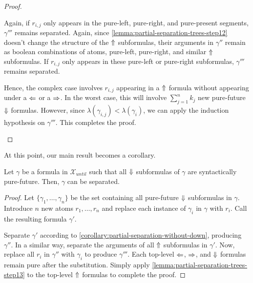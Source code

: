 \documentclass[a4paper,UKenglish,cleveref, autoref, thm-restate, numberwithinsect]{lipics-v2021}
\def\Larrow{\ensuremath\mathord{\Leftarrow}}
\def\Rarrow{\ensuremath\mathord{\Rightarrow}}
\def\Uarrow{\ensuremath\mathord{\Uparrow}}
\def\Darrow{\ensuremath\mathord{\Downarrow}}
\begin{document}
\begin{proof}
\begin{description}
        Again, if $r_{i, j}$ only appears in the pure-left, pure-right, and pure-present segments, $\gamma'''$ remains separated. Again, since \cref{lemma:partial-separation-trees-step12} doesn't change the structure of the $\Uarrow$ subformulas, their arguments in $\gamma''$ remain as boolean combinations of atoms, pure-left, pure-right, and similar $\Uarrow$ subformulas. If $r_{i, j}$ only appears in these pure-left or pure-right subformulas, $\gamma'''$ remains separated.

        Hence, the complex case involves $r_{i, j}$ appearing in a $\Uarrow$ formula without appearing under a $\Larrow$ or a $\Rarrow$. In the worst case, this will involve $\sum_{j=1}^{n} k_j$ new pure-future $\Darrow$ formulas. However, since $\lambda(\gamma_{i, j}) < \lambda(\gamma_i)$, we can apply the induction hypothesis on $\gamma'''$. This completes the proof.
    \end{description}
\end{proof}
At this point, our main result becomes a corollary.
\begin{corollary}
    \label{corollary:partial-separation-final}
    Let $\gamma$ be a formula in $\mathcal{X}_{until}$ such that all $\Darrow$ subformulas of $\gamma$ are syntactically pure-future. Then, $\gamma$ can be separated.
\end{corollary}
\begin{proof}
    Let $\{\gamma_1, \ldots, \gamma_n\}$ be the set containing all pure-future $\Darrow$ subformulas in $\gamma$. Introduce $n$ new atoms $r_1, \ldots, r_n$ and replace each instance of $\gamma_i$ in $\gamma$ with $r_i$. Call the resulting formula $\gamma'$.

    Separate $\gamma'$ according to \cref{corollary:partial-separation-without-down}, producing $\gamma''$. In a similar way, separate the arguments of all $\Uarrow$ subformulas in $\gamma'$. Now, replace all $r_i$ in $\gamma''$ with $\gamma_i$ to produce $\gamma'''$. Each top-level $\Larrow$, $\Rarrow$, and $\Darrow$ formulas remain pure after the substitution. Simply apply \cref{lemma:partial-separation-trees-step13} to the top-level $\Uarrow$ formulas to complete the proof.
\end{proof}

%








\end{document}
